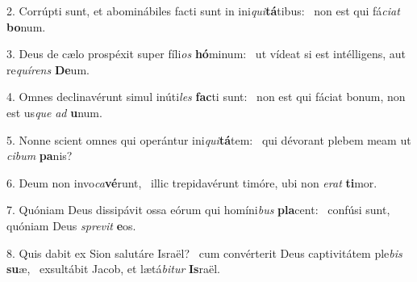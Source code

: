 2. Corrúpti sunt, et abominábiles facti sunt in ini\textit{qui}\textbf{tá}tibus: \ast\  non est qui fá\textit{ci}\textit{at} \textbf{bo}num.\

3. Deus de cælo prospéxit super fíli\textit{os} \textbf{hó}minum: \ast\  ut vídeat si est intélligens, aut re\textit{quí}\textit{rens} \textbf{De}um.\

4. Omnes declinavérunt simul inúti\textit{les} \textbf{fac}ti sunt: \ast\  non est qui fáciat bonum, non est us\textit{que} \textit{ad} \textbf{u}num.\

5. Nonne scient omnes qui operántur ini\textit{qui}\textbf{tá}tem: \ast\  qui dévorant plebem meam ut \textit{ci}\textit{bum} \textbf{pa}nis?\

6. Deum non invo\textit{ca}\textbf{vé}runt, \ast\  illic trepidavérunt timóre, ubi non \textit{e}\textit{rat} \textbf{ti}mor.\

7. Quóniam Deus dissipávit ossa eórum qui homíni\textit{bus} \textbf{pla}cent: \ast\  confúsi sunt, quóniam Deus \textit{spre}\textit{vit} \textbf{e}os.\

8. Quis dabit ex Sion salutáre Israël? \dag\  cum convérterit Deus captivitátem ple\textit{bis} \textbf{su}æ, \ast\  exsultábit Jacob, et lætá\textit{bi}\textit{tur} \textbf{Is}raël.\

